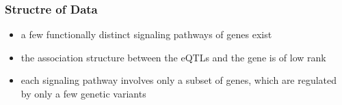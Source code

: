 \begin{frame}\frametitle{Structre of Data}
    \begin{itemize}
        \item a few functionally distinct signaling pathways of genes exist
        \item the association structure between the eQTLs and the gene is of low rank
        \item each signaling pathway involves only a subset of genes, which are regulated by only a few genetic variants
    \end{itemize}
\end{frame}
   




